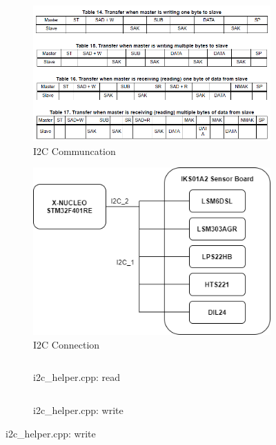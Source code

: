 \begin{center}
	\begin{figure}[H]
		\begin{subfigure}[H]{0.45\textwidth}
			\hfill\includegraphics[scale=0.6]{figures/lsm6dsl_datasheet.png}\hspace*{\fill}
			\caption{I2C Communcation}\label{fig:4a}
		\end{subfigure}
		\hfill
		\begin{subfigure}[H]{0.45\textwidth}
			\hfill\includegraphics[scale=0.5]{figures/i2c_com.png}\hspace*{\fill}
			\caption{I2C Connection}\label{fig:4b}
		\end{subfigure}
			\begin{subfigure}[H]{0.5\textwidth}
			\inputminted[framesep=1.5cm, firstline=46, lastline=67, bgcolor=whitesmoke, fontsize=\tiny]{C++}{code/i2c_helper.cpp}
			\vspace{-20pt}
			\caption{i2c\_helper.cpp: read}\label{fig:4c}
			\end{subfigure}
		\hfill
		\begin{subfigure}[H]{0.45\textwidth}
			\vspace{+1pt}
			\inputminted[framesep=1.5cm, firstline=90, lastline=112, bgcolor=whitesmoke, fontsize=\tiny]{C++}{code/i2c_helper.cpp}
			\vspace{-20pt}
			\caption{i2c\_helper.cpp: write}\label{fig:4d}
		\end{subfigure}
	\end{figure} 

	
\end{center}



